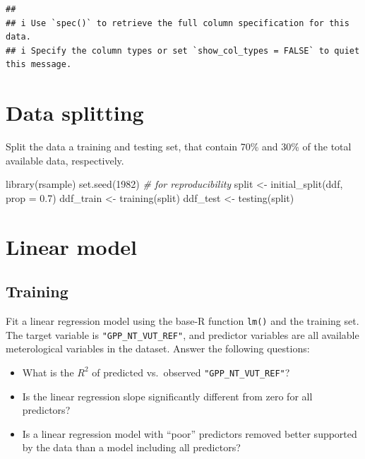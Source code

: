 \documentclass[
]{book}
\newenvironment{Shaded}{\begin{snugshade}}{\end{snugshade}}
\newcommand{\AttributeTok}[1]{\textcolor[rgb]{0.77,0.63,0.00}{#1}}
\newcommand{\CommentTok}[1]{\textcolor[rgb]{0.56,0.35,0.01}{\textit{#1}}}
\newcommand{\DecValTok}[1]{\textcolor[rgb]{0.00,0.00,0.81}{#1}}
\newcommand{\FloatTok}[1]{\textcolor[rgb]{0.00,0.00,0.81}{#1}}
\newcommand{\FunctionTok}[1]{\textcolor[rgb]{0.00,0.00,0.00}{#1}}
\newcommand{\NormalTok}[1]{#1}
\newcommand{\OtherTok}[1]{\textcolor[rgb]{0.56,0.35,0.01}{#1}}
\providecommand{\tightlist}{%
  \setlength{\itemsep}{0pt}\setlength{\parskip}{0pt}}
\begin{document}
\begin{verbatim}
## 
## i Use `spec()` to retrieve the full column specification for this data.
## i Specify the column types or set `show_col_types = FALSE` to quiet this message.
\end{verbatim}

\hypertarget{data-splitting-1}{%
\section{Data splitting}\label{data-splitting-1}}

Split the data a training and testing set, that contain 70\% and 30\% of the total available data, respectively.

\begin{Shaded}
\begin{Highlighting}[]
\FunctionTok{library}\NormalTok{(rsample)}
\FunctionTok{set.seed}\NormalTok{(}\DecValTok{1982}\NormalTok{)  }\CommentTok{\# for reproducibility}
\NormalTok{split }\OtherTok{\textless{}{-}} \FunctionTok{initial\_split}\NormalTok{(ddf, }\AttributeTok{prop =} \FloatTok{0.7}\NormalTok{)}
\NormalTok{ddf\_train }\OtherTok{\textless{}{-}} \FunctionTok{training}\NormalTok{(split)}
\NormalTok{ddf\_test }\OtherTok{\textless{}{-}} \FunctionTok{testing}\NormalTok{(split)}
\end{Highlighting}
\end{Shaded}

\hypertarget{linear-model}{%
\section{Linear model}\label{linear-model}}

\hypertarget{training-1}{%
\subsection{Training}\label{training-1}}

Fit a linear regression model using the base-R function \texttt{lm()} and the training set. The target variable is \texttt{"GPP\_NT\_VUT\_REF"}, and predictor variables are all available meterological variables in the dataset. Answer the following questions:

\begin{itemize}
\tightlist
\item
  What is the \(R^2\) of predicted vs.~observed \texttt{"GPP\_NT\_VUT\_REF"}?
\item
  Is the linear regression slope significantly different from zero for all predictors?
\item
  Is a linear regression model with ``poor'' predictors removed better supported by the data than a model including all predictors?
\end{itemize}
\end{document}
